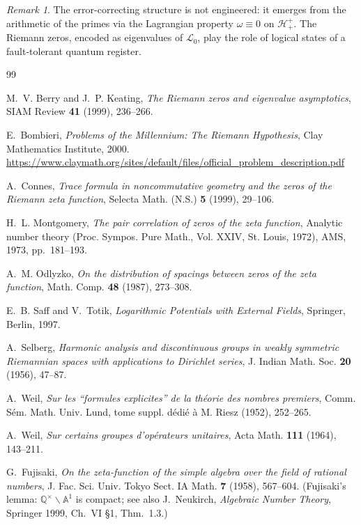 \documentclass[12pt,a4paper]{article}
\theoremstyle{remark}
\newtheorem*{remark}{Remark}
\begin{document}
\begin{remark}
The error-correcting structure is not engineered: it emerges from the
arithmetic of the primes via the Lagrangian property $\omega\equiv 0$
on $\mathcal{H}^+_+$.
The Riemann zeros, encoded as eigenvalues of $\mathcal{L}_0$, play
the role of logical states of a fault-tolerant quantum register.
\end{remark}

\begin{thebibliography}{99}

M.~V. Berry and J.~P. Keating,
\textit{The Riemann zeros and eigenvalue asymptotics},
SIAM Review \textbf{41} (1999), 236--266.

E.~Bombieri,
\textit{Problems of the Millennium: The Riemann Hypothesis},
Clay Mathematics Institute, 2000.
\url{https://www.claymath.org/sites/default/files/official_problem_description.pdf}

A.~Connes,
\textit{Trace formula in noncommutative geometry and the zeros of the
Riemann zeta function},
Selecta Math. (N.S.) \textbf{5} (1999), 29--106.

H.~L. Montgomery,
\textit{The pair correlation of zeros of the zeta function},
Analytic number theory (Proc. Sympos. Pure Math., Vol. XXIV,
St. Louis, 1972), AMS, 1973, pp.~181--193.

A.~M. Odlyzko,
\textit{On the distribution of spacings between zeros of the zeta function},
Math. Comp. \textbf{48} (1987), 273--308.

E.~B. Saff and V.~Totik,
\textit{Logarithmic Potentials with External Fields},
Springer, Berlin, 1997.

A.~Selberg,
\textit{Harmonic analysis and discontinuous groups in weakly symmetric
Riemannian spaces with applications to Dirichlet series},
J. Indian Math. Soc. \textbf{20} (1956), 47--87.

A.~Weil,
\textit{Sur les ``formules explicites'' de la th\'eorie des nombres
premiers},
Comm. S\'em. Math. Univ. Lund, tome suppl. d\'edi\'e \`a M. Riesz
(1952), 252--265.

A.~Weil,
\textit{Sur certains groupes d'op\'erateurs unitaires},
Acta Math. \textbf{111} (1964), 143--211.

G.~Fujisaki,
\textit{On the zeta-function of the simple algebra over the field of
rational numbers},
J. Fac. Sci. Univ. Tokyo Sect. IA Math. \textbf{7} (1958), 567--604.
(Fujisaki's lemma: $\mathbb{Q}^\times\backslash\mathbb{A}^1$ is compact;
see also J.~Neukirch, \textit{Algebraic Number Theory}, Springer 1999,
Ch.~VI \S1, Thm.~1.3.)

\end{thebibliography}
\end{document}
